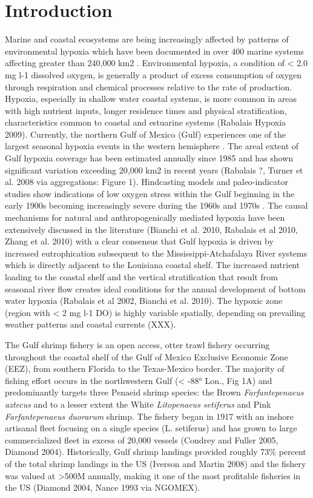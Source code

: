 \documentclass[10pt]{article}
\begin{document}
\section*{Introduction}
Marine and coastal ecosystems are being increasingly affected by patterns of environmental hypoxia which have been documented in over 400 marine systems affecting greater than 240,000 km2 \cite{diaz_spreading_2008}.  Environmental hypoxia, a condition of < 2.0 mg l-1 dissolved oxygen, is generally a product of excess consumption of oxygen through respiration and chemical processes relative to the rate of production.  Hypoxia, especially in shallow water coastal systems, is more common in areas with high nutrient inputs, longer residence times and physical stratification, characteristics common to coastal and estuarine systems (Rabalais Hypoxia 2009).  Currently, the northern Gulf of Mexico (Gulf) experiences one of the largest seasonal hypoxia events in the western hemisphere \cite{rabalais_beyond_2002, rabalais_characterization_2007}.  The areal extent of Gulf hypoxia coverage has been estimated annually since 1985 and has shown significant variation exceeding 20,000 km2 in recent years (Rabalais ?, Turner et al. 2008 via aggregations: Figure 1).  Hindcasting models and paleo-indicator studies show indications of low oxygen stress within the Gulf beginning in the early 1900s becoming increasingly severe during the 1960s and 1970s \cite{justic_forecasting_2007, rabalais+sediments_2007, greene_multiple_2009}.  The causal mechanisms for natural and anthropogenically mediated hypoxia have been extensively discussed in the literature (Bianchi et al. 2010, Rabalais et al 2010, Zhang et al. 2010) with a clear consensus that Gulf hypoxia is driven by increased eutrophication subsequent to the Mississippi-Atchafalaya River systems which is directly adjacent to the Louisiana coastal shelf.  The increased nutrient loading to the coastal shelf and the vertical stratification that result from seasonal river flow creates ideal conditions for the annual development of bottom water hypoxia (Rabalais et al 2002, Bianchi et al. 2010).  The hypoxic zone (region with < 2 mg l-1 DO) is highly variable spatially, depending on prevailing weather patterns and coastal currents (XXX).

The Gulf shrimp fishery is an open access, otter trawl fishery occurring throughout the coastal shelf of the Gulf of Mexico Exclusive Economic Zone (EEZ), from southern Florida to the Texas-Mexico border.  The majority of fishing effort occurs in the northwestern Gulf (< -88° Lon., Fig 1A) and predominantly targets three Penaeid shrimp species: the Brown \textit{Farfantepenaeus aztecus} and to a lesser extent the White \textit{Litopenaeus setiferus} and Pink \textit{Farfantepenaeus duorarum} shrimp.  The fishery began in 1917 with an inshore artisanal fleet focusing on a single species (L. setiferus) and has grown to large commercialized fleet in excess of 20,000 vessels (Condrey and Fuller 2005, Diamond 2004).  Historically, Gulf shrimp landings provided roughly 73\% percent of the total shrimp landings in the US (Iverson and Martin 2008) and the fishery was valued at >500M annually, making it one of the most profitable fisheries in the US (Diamond 2004, Nance 1993 via NGOMEX).  
\end{document}
